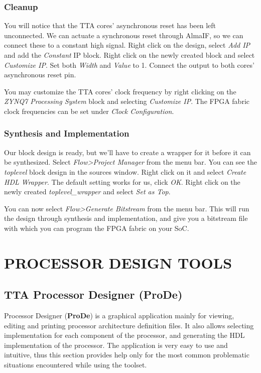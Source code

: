 \documentclass[twoside]{tceusermanual}
\begin{document}
\subsection{Cleanup}

You will notice that the TTA cores' asynchronous reset has been left
unconnected. We can actuate a synchronous reset through AlmaIF, so we can
connect these to a constant high signal. Right click on the design, select
\textit{Add IP} and add the \textit{Constant} IP block. Right click on the
newly created block and select \textit{Customize IP}. Set both \textit{Width}
and \textit{Value} to 1. Connect the output to both cores' asynchronous reset
pin.

You may customize the TTA cores' clock frequency by right clicking on the
\textit{ZYNQ7 Processing System} block and selecting \textit{Customize IP}.
The FPGA fabric clock frequencies can be set under \textit{Clock Configuration}.

\subsection{Synthesis and Implementation}

Our block design is ready, but we'll have to create a wrapper for it before
it can be synthesized. Select \textit{Flow>Project Manager} from the menu bar.
You can see the \textit{toplevel} block design in the sources window. Right
click on it and select \textit{Create HDL Wrapper}. The default setting works
for us, click \textit{OK}. Right click on the newly created
\textit{toplevel\_wrapper} and select \textit{Set as Top}.

You can now select \textit{Flow>Generate Bitstream} from the menu bar. This will
run the design through synthesis and implementation, and give you a bitstream
file with which you can program the FPGA fabric on your SoC.

\chapter{PROCESSOR DESIGN TOOLS}
\label{chapter:procgen}

\section{TTA Processor Designer (ProDe)}
\label{sec:prode}

Processor Designer (\textbf{ProDe}) is a graphical application mainly for
viewing, editing and printing processor architecture definition files. 
It also allows selecting implementation for each component of the processor,
and generating the HDL implementation of the processor. The application is
very easy to use and intuitive, thus this section provides help only for the
most common problematic situations encountered while using the toolset.
\end{document}
